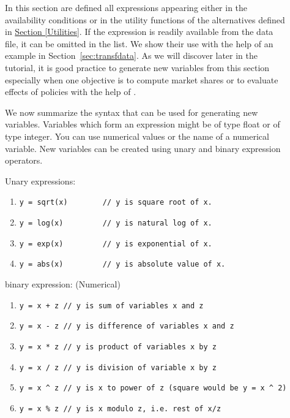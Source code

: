 \documentclass[12pt]{memoir}
\begin{document}
\begin{description}
   \item[]
      In this section are defined all expressions appearing either in the
      availability conditions or in the utility functions of the alternatives
      defined in \hyperlink{Utilities}{Section [Utilities]}. If the expression is
      readily available from the data file, it can be omitted in the list. 
      We show their use with the help of an example in Section~\ref{sec:transfdata}. As we 
      will discover later in the tutorial, it is good practice to generate new variables from this 
      section especially when one objective is to compute market shares or to evaluate effects of 
      policies with the help of \BIOSIM.

      We now summarize the syntax that can be used for generating new variables. Variables which form
      an expression might be of type float or of type integer.  You can use numerical values or the name
      of a numerical variable. New variables can be created using unary and binary expression operators.

      Unary expressions:
         \begin{enumerate}
            \item  \verb$y = sqrt(x)        // y is square root of x.$
            \item  \verb$y = log(x)         // y is natural log of x.$
            \item  \verb$y = exp(x)         // y is exponential of x.$
            \item  \verb$y = abs(x)         // y is absolute value of x.$     
         \end{enumerate}

      binary expression:  (Numerical) 
         \begin{enumerate}
            \item  \verb$y = x + z // y is sum of variables x and z$
            \item  \verb$y = x - z // y is difference of variables x and z$
            \item  \verb$y = x * z // y is product of variables x by z$
            \item  \verb$y = x / z // y is division of variable x by z$
            \item  \verb$y = x ^ z // y is x to power of z (square would be y = x ^ 2) $
            \item  \verb$y = x % z // y is x modulo z, i.e. rest of x/z $
         \end{enumerate}


\end{description}
\end{document}
